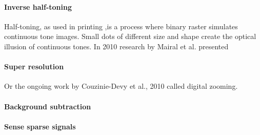 \paragraph{Inverse half-toning} Half-toning, as used in printing ,is a process
where binary raster simulates continuous tone images. Small dots of different
size and shape create the optical illusion of continuous tones. In 2010 research
by Mairal et al.\cite{Mairal2010b} presented 

\paragraph{Super resolution} \cite{Wright2008,Yang2010}  
Or the ongoing work by Couzinie-Devy et al., 2010 called digital zooming.

\paragraph{Background subtraction}\cite{}

\paragraph{Sense sparse signals}\cite{Duarte2009}






